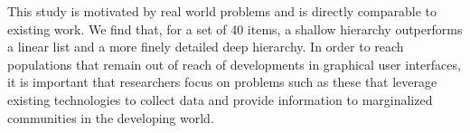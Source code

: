 \documentclass{sigchi}
\begin{document}
This study is motivated by real world problems and is directly comparable to existing work. We find that, for a set of 40 items, a shallow hierarchy outperforms a linear list and a more finely detailed deep hierarchy. In order to reach populations that remain out of reach of developments in graphical user interfaces, it is important that researchers focus on problems such as these that leverage existing technologies to collect data and provide information to marginalized communities in the developing world. 

%
%
%
%
%
\balance



\end{document}
